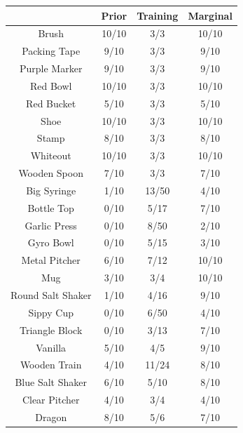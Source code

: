 \documentclass{article}
\begin{document}
\begin{table}
\begin{tabular}{cccc}
\toprule
		    & Prior         &  Training     & Marginal\\
\midrule
Brush    	    & 10/10         &  3/3         &  10/10\\
Packing Tape        & 9/10          &  3/3         &  9/10 \\
Purple Marker       & 9/10          &  3/3         &  9/10 \\
Red Bowl    	    & 10/10         &  3/3         &  10/10\\
Red Bucket    	    & 5/10          &  3/3         &  5/10 \\
Shoe    	    & 10/10         &  3/3         &  10/10\\
Stamp    	    & 8/10          &  3/3         &  8/10 \\
Whiteout    	    & 10/10         &  3/3         &  10/10\\
Wooden Spoon        & 7/10          &  3/3         &  7/10 \\
\midrule
Big Syringe    	    & 1/10          &  13/50       &  4/10 \\
Bottle Top    	    & 0/10          &  5/17        &  7/10 \\
Garlic Press        & 0/10          &  8/50        &  2/10 \\
Gyro Bowl    	    & 0/10          &  5/15        &  3/10 \\
Metal Pitcher       & 6/10          &  7/12        &  10/10\\
Mug    		    & 3/10          &  3/4         &  10/10\\
Round Salt Shaker   & 1/10          &  4/16        &  9/10 \\
Sippy Cup    	    & 0/10          &  6/50        &  4/10 \\
Triangle Block      & 0/10          &  3/13        &  7/10 \\
Vanilla	   	    & 5/10          &  4/5         &  9/10 \\
Wooden Train        & 4/10          &  11/24       &  8/10 \\
\midrule
Blue Salt Shaker    & 6/10          &  5/10        &  8/10 \\
Clear Pitcher       & 4/10          &  3/4         &  4/10 \\
Dragon    	    & 8/10          &  5/6         &  7/10 \\

\end{tabular}
\end{table}
\end{document}
